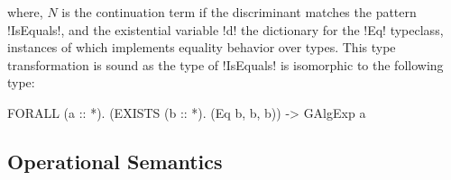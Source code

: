 \documentclass[screen,nonacm,manuscript,review]{acmart} %
\begin{document}
where, $N$ is the continuation term if the discriminant matches the pattern
!IsEquals!, and the existential variable !d! the dictionary for the !Eq!
typeclass, instances of which implements equality behavior over types.
This type transformation is sound as the type of !IsEquals! is
isomorphic to the following type:

\begin{CenteredBox}
\begin{code}
FORALL (a :: *). (EXISTS (b :: *). (Eq b, b, b)) -> GAlgExp a
\end{code}
\end{CenteredBox}

\subsection{Operational Semantics}\label{sec:sfc-op-sem}
\newcommand{\Beta}{
 \ib{\irule[\trule{$\beta$}]
 {};
 {$\stepsto {(\Lam {x\co\tau} M) \App N} {\Set{x\mapsto N}M}$}
 }
}
\newcommand{\TBeta}{
 \ib{\irule[\trule{Ty-$\beta$}]
 {};
 {$\stepsto {(\TLam \TyVar M) \App \tau} {\Set{\TyVar\mapsto \tau}M}$}
 }
}
\newcommand{\CaseE}{
 \ib{\irule[\trule{case}]
 {};
 {\stepsto {\Case {(K \many\sigma\many\phi\many\Tm)} {\Set{...; K\App\many\beta\App\many x \to N; ...}}} {\Set{\many {\beta\mapsto\phi}, \many{x\mapsto\Tm}}N}}
 }
}
\newcommand{\CoTransE}{
 \ib{\irule[\trule{Co-Trans}]
 {};
 {$\stepsto {\Cast {(\Cast \Val \Co)} {\nu}} {\Cast \Val {(\trans{\Co} {\nu})}}$}
 }
}

\newcommand{\TyPush}{
 \ib{\irule[\trule{ty-push}];
 {$\stepsto {(\Cast{\TLam {\TyVar\co\kappa} M}\Co)\App \tau} {({\TLam {\TyVar\co\kappa} (\Cast M {\Co\At\TyVar})})\App \tau}$}
 }
}

\newcommand{\CoPush}{
 \ib{\irule[\trule{co-push}]
 {\substack {\mathlarger{\nu\co \sigma_1' \sim \sigma_2'}\\
 \mathlarger{\Co_1 : \sigma_1 \sim \sigma_1' = \Left {(\Left \Co)}}}}
 {\substack {\mathlarger{\Co\co (\sigma_1 \sim \sigma_2 \then \sigma_3) \sim (\sigma_1' \sim \sigma_2' \then \sigma_3')}\\
 \mathlarger{{\Co_2: \sigma_2 \sim \sigma_2' = \Right{(\Left\Co)}\quad{\Co_3:\sigma_3\sim\sigma_3' = \Right\Co}}}}};
 {$\stepsto {(\Cast{\TLam {\TyVar\co(\sigma_1\sim\sigma_2)} M}\Co)\App \nu} {\Cast {(\TLam {\TyVar\co(\sigma_1\sim\sigma_2)} M)\App (\Co_1 \circ \nu \circ \Sym \Co_2)} {\Co_3}} $}
 }
}

\newcommand{\Push}{
 \ib{\irule[\trule{push}]
 {\Co : \tau_1 \to \tau_2 \sim \tau_1' \to \tau_2'}
 {\Co_1 = \Right (\Left \Co)}
 {\Co_2 = \Right \Co};
 {$\stepsto {({\Cast {(\Lam x M)} {\Co}}) \App N} {\Cast {(({\Lam x M})\App {(\Cast N {\Sym \Co_1})})} \Co_2}$}
 }
}
\end{document}
